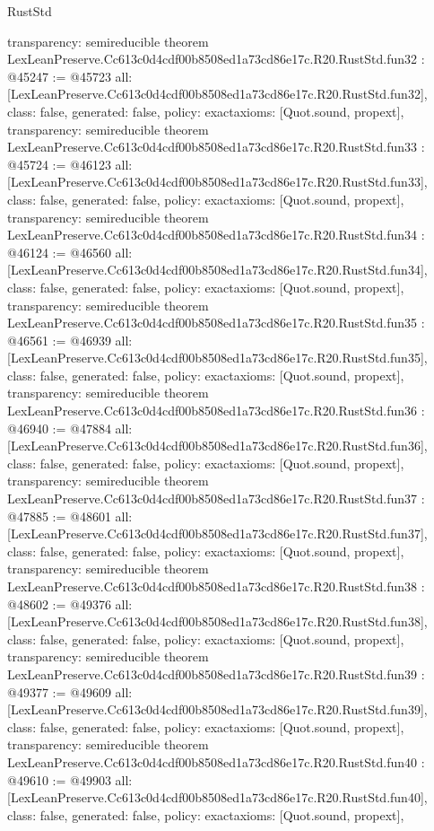 \begin{lexlean}{RustStd}
\begin{coremodule}
{  transparency: semireducible
}
theorem LexLeanPreserve.Cc613c0d4cdf00b8508ed1a73cd86e17c.R20.RustStd.fun32 : @45247 := @45723 {
  all: [LexLeanPreserve.Cc613c0d4cdf00b8508ed1a73cd86e17c.R20.RustStd.fun32],
  class: false,
  generated: false,
  policy: exact{axioms: [Quot.sound, propext]},
  transparency: semireducible
}
theorem LexLeanPreserve.Cc613c0d4cdf00b8508ed1a73cd86e17c.R20.RustStd.fun33 : @45724 := @46123 {
  all: [LexLeanPreserve.Cc613c0d4cdf00b8508ed1a73cd86e17c.R20.RustStd.fun33],
  class: false,
  generated: false,
  policy: exact{axioms: [Quot.sound, propext]},
  transparency: semireducible
}
theorem LexLeanPreserve.Cc613c0d4cdf00b8508ed1a73cd86e17c.R20.RustStd.fun34 : @46124 := @46560 {
  all: [LexLeanPreserve.Cc613c0d4cdf00b8508ed1a73cd86e17c.R20.RustStd.fun34],
  class: false,
  generated: false,
  policy: exact{axioms: [Quot.sound, propext]},
  transparency: semireducible
}
theorem LexLeanPreserve.Cc613c0d4cdf00b8508ed1a73cd86e17c.R20.RustStd.fun35 : @46561 := @46939 {
  all: [LexLeanPreserve.Cc613c0d4cdf00b8508ed1a73cd86e17c.R20.RustStd.fun35],
  class: false,
  generated: false,
  policy: exact{axioms: [Quot.sound, propext]},
  transparency: semireducible
}
theorem LexLeanPreserve.Cc613c0d4cdf00b8508ed1a73cd86e17c.R20.RustStd.fun36 : @46940 := @47884 {
  all: [LexLeanPreserve.Cc613c0d4cdf00b8508ed1a73cd86e17c.R20.RustStd.fun36],
  class: false,
  generated: false,
  policy: exact{axioms: [Quot.sound, propext]},
  transparency: semireducible
}
theorem LexLeanPreserve.Cc613c0d4cdf00b8508ed1a73cd86e17c.R20.RustStd.fun37 : @47885 := @48601 {
  all: [LexLeanPreserve.Cc613c0d4cdf00b8508ed1a73cd86e17c.R20.RustStd.fun37],
  class: false,
  generated: false,
  policy: exact{axioms: [Quot.sound, propext]},
  transparency: semireducible
}
theorem LexLeanPreserve.Cc613c0d4cdf00b8508ed1a73cd86e17c.R20.RustStd.fun38 : @48602 := @49376 {
  all: [LexLeanPreserve.Cc613c0d4cdf00b8508ed1a73cd86e17c.R20.RustStd.fun38],
  class: false,
  generated: false,
  policy: exact{axioms: [Quot.sound, propext]},
  transparency: semireducible
}
theorem LexLeanPreserve.Cc613c0d4cdf00b8508ed1a73cd86e17c.R20.RustStd.fun39 : @49377 := @49609 {
  all: [LexLeanPreserve.Cc613c0d4cdf00b8508ed1a73cd86e17c.R20.RustStd.fun39],
  class: false,
  generated: false,
  policy: exact{axioms: [Quot.sound, propext]},
  transparency: semireducible
}
theorem LexLeanPreserve.Cc613c0d4cdf00b8508ed1a73cd86e17c.R20.RustStd.fun40 : @49610 := @49903 {
  all: [LexLeanPreserve.Cc613c0d4cdf00b8508ed1a73cd86e17c.R20.RustStd.fun40],
  class: false,
  generated: false,
  policy: exact{axioms: [Quot.sound, propext]},
}
\end{coremodule}
\end{lexlean}
